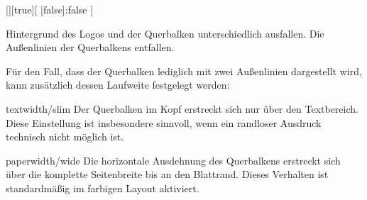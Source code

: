 \begin{Declaration}{[\PSet]}[true][%
  [false]:false%
]
\begin{values}
  Hintergrund des Logos und der Querbalken unterschiedlich ausfallen. Die 
  Außenlinien der Querbalkens entfallen.
\end{values}
%
Für den Fall, dass der Querbalken lediglich mit zwei Außenlinien dargestellt 
wird, kann zusätzlich dessen Laufweite festgelegt werden:
%
\begin{values}
\item[textwidth/slim]
  Der Querbalken im Kopf erstreckt sich nur über den Textbereich. Diese 
  Einstellung ist insbesondere sinnvoll, wenn ein randloser Ausdruck technisch 
  nicht möglich ist.   
\item[paperwidth/wide]
  Die horizontale Ausdehnung des Querbalkens erstreckt sich über die komplette 
  Seitenbreite bis an den Blattrand. Dieses Verhalten ist standardmäßig im 
  farbigen Layout aktiviert.
\end{values}
\end{Declaration}

